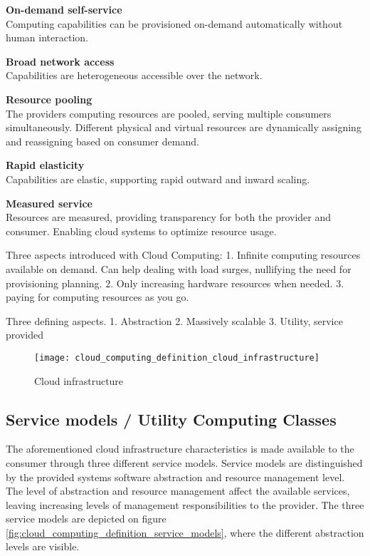 \textbf{On-demand self-service}\\
Computing capabilities can be provisioned on-demand automatically without human interaction.


\textbf{Broad network access}\\
Capabilities are heterogeneous accessible over the network.


\textbf{Resource pooling}\\
The providers computing resources are pooled, serving multiple consumers simultaneously. Different physical and virtual resources are dynamically assigning and reassigning based on consumer demand.


\textbf{Rapid elasticity}\\
Capabilities are elastic, supporting rapid outward and inward scaling. 


\textbf{Measured service}\\
Resources are measured, providing transparency for both the provider and consumer. Enabling cloud systems to optimize resource usage.




Three aspects introduced with Cloud Computing: \cite{armbrust2010view}
1. Infinite computing resources available on demand. Can help dealing with load surges, nullifying the need for provisioning planning.
2. Only increasing hardware resources when needed.
3. paying for computing resources as you go.

Three defining aspects\cite{sosinsky2010cloud}.
1. Abstraction
2. Massively scalable
3. Utility, service provided

\begin{figure}[!htb]
  \texttt{[image: cloud\_computing\_definition\_cloud\_infrastructure]}  
  \caption{Cloud infrastructure}
  \label{fig:cloud_computing_definition_cloud_infrastructure}
\end{figure}

\subsection{Service models / Utility Computing Classes}
The aforementioned cloud infrastructure characteristics is made available to the consumer through three different service models\cite{mell2011nist}.
Service models are distinguished by the provided systems software abstraction and resource management level. The level of abstraction and resource management affect the available services, leaving increasing levels of management responsibilities to the provider\cite[p. 52]{armbrust2010view}.
The three service models are depicted on figure \ref{fig:cloud_computing_definition_service_models}, where the different abstraction levels are visible.

